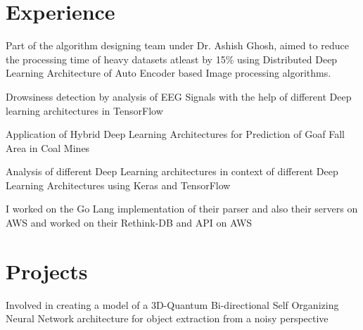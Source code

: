 \documentclass[]{imman_resume}
\begin{document}
\begin{minipage}[t]{0.66\textwidth} 


\section{Experience}

\vspace{\topsep} %
\begin{tightemize}
\item Part of the algorithm designing team under Dr. Ashish Ghosh, aimed to reduce the processing time of heavy datasets atleast by 15\% using Distributed Deep Learning Architecture  of Auto Encoder based Image processing algorithms.
\end{tightemize}
\sectionsep

\begin{tightemize}
\item Drowsiness detection by analysis of EEG Signals with the help of different Deep learning architectures in TensorFlow
\item Application of Hybrid Deep Learning Architectures for Prediction of Goaf Fall Area in Coal Mines
\end{tightemize}
\sectionsep

\begin{tightemize}
\item Analysis of different Deep Learning architectures in context of different Deep Learning Architectures using Keras and TensorFlow
\end{tightemize}
\sectionsep

\begin{tightemize}
\item I worked on the Go Lang implementation of their parser and also their servers on AWS and worked on their Rethink-DB and API on AWS
\end{tightemize}
\sectionsep

\section{Projects}
Involved in creating a model of a 3D-Quantum Bi-directional Self Organizing Neural Network architecture for object extraction from a noisy perspective
\sectionsep


\end{minipage}
\end{document}
